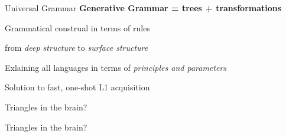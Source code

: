 \documentclass[aspectratio=169,cramped]{beamer}
\let\tempone\itemize
\let\temptwo\enditemize
\renewenvironment{itemize}{\tempone\addtolength{\itemsep}{-0\baselineskip}\addtolength{\parskip}{-0.2\baselineskip}}{\temptwo}
\begin{document}
\begin{frame}{Universal Grammar}
	\textbf{Generative Grammar = trees + transformations}
	\begin{itemize}
  \item Grammatical construal in terms of rules
    \begin{itemize}
    \item from \emph{deep structure} to \emph{surface structure}
    \end{itemize}
  \item Exlaining all languages in terms of \emph{principles and parameters}
    \begin{itemize}
    \item Solution to fast, one-shot L1 acquisition
    \end{itemize}
  \end{itemize}
\end{frame}

\begin{frame}{Triangles in the brain?}
  \begin{figure}
    \centering
    \vspace{-2cm}
    \hspace{1cm}
  \end{figure}
\end{frame}

\begin{frame}{Triangles in the brain?}
  \begin{figure}
    \centering
    \vspace{-2cm}
    \hspace{1cm}
  \end{figure}
\end{frame}
\end{document}
